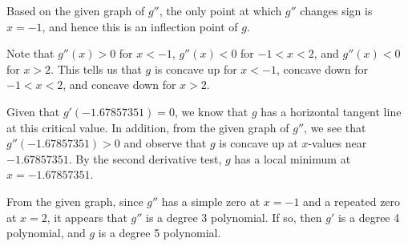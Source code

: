 \begin{activitySolution}
\ba 
  \item Based on the given graph of $g''$, the only point at which $g''$ changes sign is $x = -1$, and hence this is an inflection point of $g$. 
  \item Note that $g''(x) > 0$ for $x < -1$, $g''(x) < 0$ for $-1 < x < 2$, and $g''(x) < 0$ for $x > 2$.  This tells us that $g$ is concave up for $x < -1$, concave down for $-1 < x < 2$, and concave down for $x > 2$.
  \item Given that $g'(-1.67857351) = 0$, we know that $g$ has a horizontal tangent line at this critical value.  In addition, from the given graph of $g''$, we see that $g''( -1.67857351) > 0$ and observe that $g$ is concave up at $x$-values near $-1.67857351$.  By the second derivative test, $g$ has a local minimum at $x = -1.67857351$.
  \item From the given graph, since $g''$ has a simple zero at $x = -1$ and a repeated zero at $x = 2$, it appears that $g''$ is a degree 3 polynomial.  If so, then $g'$ is a degree 4 polynomial, and $g$ is a degree 5 polynomial.
\ea
\end{activitySolution}
\aftera